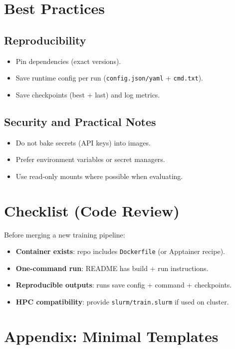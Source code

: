 \documentclass[11pt]{article}
\begin{document}
\section{Best Practices}

\subsection{Reproducibility}
\begin{itemize}
  \item Pin dependencies (exact versions).
  \item Save runtime config per run (\texttt{config.json/yaml} + \texttt{cmd.txt}).
  \item Save checkpoints (best + last) and log metrics.
\end{itemize}

\subsection{Security and Practical Notes}
\begin{itemize}
  \item Do not bake secrets (API keys) into images.
  \item Prefer environment variables or secret managers.
  \item Use read-only mounts where possible when evaluating.
\end{itemize}

\section{Checklist (Code Review)}
Before merging a new training pipeline:
\begin{itemize}
  \item \textbf{Container exists}: repo includes \texttt{Dockerfile} (or Apptainer recipe).
  \item \textbf{One-command run}: README has build + run instructions.
  \item \textbf{Reproducible outputs}: runs save config + command + checkpoints.
  \item \textbf{HPC compatibility}: provide \texttt{slurm/train.slurm} if used on cluster.
\end{itemize}

\section{Appendix: Minimal Templates}
\end{document}
